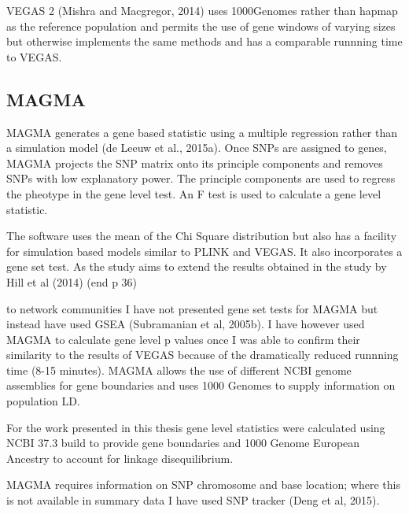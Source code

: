 VEGAS 2 (Mishra and Macgregor, 2014) uses 1000Genomes rather than hapmap as the reference population and permits the use of gene windows of varying sizes but otherwise implements the same methods and has a comparable runnning time to VEGAS.

\subsection{MAGMA}
\label{sec:MAGMA_gene_scores}
MAGMA generates a gene based statistic using a multiple regression rather than a simulation model (de Leeuw et al., 2015a). Once SNPs are assigned to genes, MAGMA projects the SNP matrix onto its principle components and removes SNPs with low explanatory power. The principle components are used to regress the pheotype in the gene level test. An F test is used to calculate a gene level statistic. 

The software uses the mean of the Chi Square distribution but also has a facility for simulation based models similar to PLINK and VEGAS. It also incorporates a gene set test. As the study aims to extend the results obtained in the study by Hill et al (2014) (end p 36)

to network communities I have not presented gene set tests for MAGMA but instead have used GSEA (Subramanian et al, 2005b). I have however used MAGMA to calculate gene level p values once I was able to confirm their similarity to the results of VEGAS because of the dramatically reduced runnning time (8-15 minutes).
MAGMA allows the use of different NCBI genome assemblies for gene boundaries and uses 1000 Genomes to supply information on population LD.

For the work presented in this thesis gene level statistics were calculated using NCBI 37.3 build to provide gene boundaries and 1000 Genome European Ancestry to account for linkage disequilibrium. 


MAGMA requires information on SNP chromosome and base location; where this is not available in summary data I have used SNP tracker (Deng et al, 2015).

